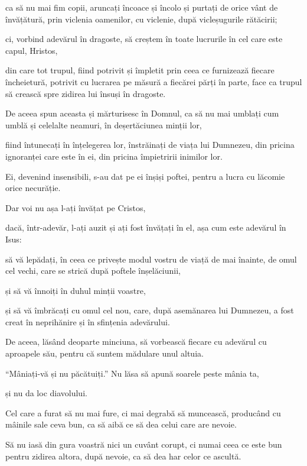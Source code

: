 {ca să nu mai fim copii, aruncați încoace și încolo și purtați de orice vânt de învățătură, prin viclenia oamenilor, cu viclenie, după vicleșugurile rătăcirii;

ci, vorbind adevărul în dragoste, să creștem în toate lucrurile în cel care este capul, Hristos,

din care tot trupul, fiind potrivit și împletit prin ceea ce furnizează fiecare încheietură, potrivit cu lucrarea pe măsură a fiecărei părți în parte, face ca trupul să crească spre zidirea lui însuși în dragoste.


\par }{\PP {}De aceea spun aceasta și mărturisesc în Domnul, ca să nu mai umblați cum umblă și celelalte neamuri, în deșertăciunea minții lor,

fiind întunecați în înțelegerea lor, înstrăinați de viața lui Dumnezeu, din pricina ignoranței care este în ei, din pricina împietririi inimilor lor.

Ei, devenind insensibili, s-au dat pe ei înșiși poftei, pentru a lucra cu lăcomie orice necurăție.

Dar voi nu așa l-ați învățat pe Cristos,

dacă, într-adevăr, l-ați auzit și ați fost învățați în el, așa cum este adevărul în Isus:

să vă lepădați, în ceea ce privește modul vostru de viață de mai înainte, de omul cel vechi, care se strică după poftele înșelăciunii,

și să vă înnoiți în duhul minții voastre,

și să vă îmbrăcați cu omul cel nou, care, după asemănarea lui Dumnezeu, a fost creat în neprihănire și în sfințenia adevărului.


\par }{\PP {}De aceea, lăsând deoparte minciuna, să vorbească fiecare cu adevărul cu aproapele său, pentru că suntem mădulare unul altuia.

“Mâniați-vă și nu păcătuiți.” Nu lăsa să apună soarele peste mânia ta,

și nu da loc diavolului.

Cel care a furat să nu mai fure, ci mai degrabă să muncească, producând cu mâinile sale ceva bun, ca să aibă ce să dea celui care are nevoie.

Să nu iasă din gura voastră nici un cuvânt corupt, ci numai ceea ce este bun pentru zidirea altora, după nevoie, ca să dea har celor ce ascultă.

}
